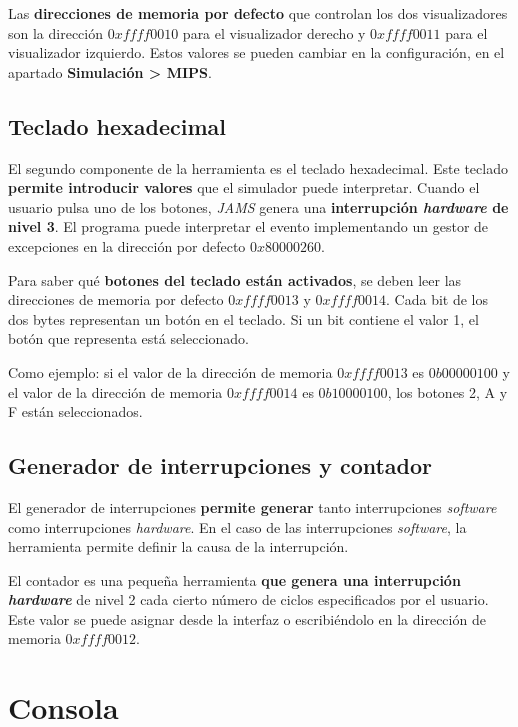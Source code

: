Las \textbf{direcciones de memoria por defecto} que controlan los dos
visualizadores son la dirección $0xffff0010$ para el visualizador derecho y
$0xffff0011$ para el visualizador izquierdo.
Estos valores se pueden cambiar en la configuración,
en el apartado \textbf{Simulación > MIPS}.

\subsection{Teclado hexadecimal}\label{subsec:teclado-hexadecimal}

El segundo componente de la herramienta es el teclado hexadecimal.
Este teclado \textbf{permite introducir valores} que el
simulador puede interpretar.
Cuando el usuario pulsa uno de los botones,
\textit{JAMS} genera una \textbf{interrupción \textit{hardware} de nivel 3}.
El programa puede interpretar el evento implementando un gestor
de excepciones en la dirección por defecto $0x80000260$.

Para saber qué \textbf{botones del teclado están activados},
se deben leer las direcciones de memoria por defecto $0xffff0013$ y $0xffff0014$.
Cada bit de los dos bytes representan un botón en el teclado.
Si un bit contiene el valor 1, el botón que representa está seleccionado.

Como ejemplo: si el valor de la dirección de memoria
$0xffff0013$ es $0b00000100$ y el valor de la dirección de memoria
$0xffff0014$ es $0b10000100$, los botones 2, A y F están seleccionados.

\subsection{Generador de interrupciones y contador}\label{subsec:generador-de-interrupciones-contador}

El generador de interrupciones \textbf{permite generar} tanto
interrupciones \textit{software} como interrupciones \textit{hardware}.
En el caso de las interrupciones \textit{software},
la herramienta permite definir la causa de la interrupción.

El contador es una pequeña herramienta
\textbf{que genera una interrupción \textit{hardware}}
de nivel 2 cada cierto número de ciclos especificados por el usuario.
Este valor se puede asignar desde la interfaz o escribiéndolo
en la dirección de memoria $0xffff0012$.

\section{Consola}\label{sec:consola}

